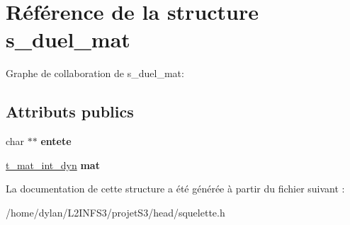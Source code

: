 \hypertarget{structs__duel__mat}{}\section{Référence de la structure s\+\_\+duel\+\_\+mat}
\label{structs__duel__mat}


Graphe de collaboration de s\+\_\+duel\+\_\+mat\+:
\subsection*{Attributs publics}
\begin{DoxyCompactItemize}
\item 
\mbox{\label{structs__duel__mat_aa9295c166178d9ae2c32369328c17b56}} 
char $\ast$$\ast$ {\bfseries entete}
\item 
\mbox{\label{structs__duel__mat_a789fa8c58c9a7d3285a4b0f13282708b}} 
\hyperlink{structs__mat__dyn}{t\+\_\+mat\+\_\+int\+\_\+dyn} {\bfseries mat}
\end{DoxyCompactItemize}


La documentation de cette structure a été générée à partir du fichier suivant \+:\begin{DoxyCompactItemize}
\item 
/home/dylan/\+L2\+I\+N\+F\+S3/projet\+S3/head/squelette.\+h\end{DoxyCompactItemize}
